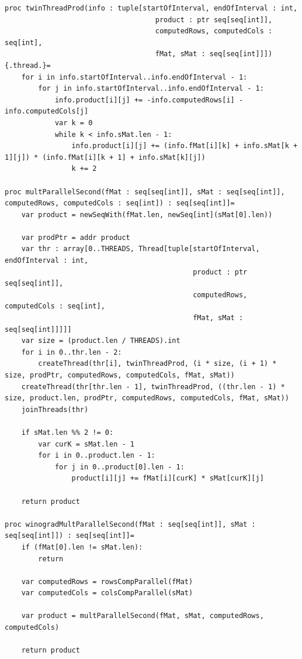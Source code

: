 \documentclass[12pt]{report}
\begin{document}
\begin{lstlisting}[caption=Реализация второй схемы параллельного алгоритма Копперсмита-Винограда,
label={list:paral2}]
proc twinThreadProd(info : tuple[startOfInterval, endOfInterval : int,
                                    product : ptr seq[seq[int]],
                                    computedRows, computedCols : seq[int],
                                    fMat, sMat : seq[seq[int]]]) {.thread.}=
    for i in info.startOfInterval..info.endOfInterval - 1:
        for j in info.startOfInterval..info.endOfInterval - 1:
            info.product[i][j] += -info.computedRows[i] - info.computedCols[j]
            var k = 0
            while k < info.sMat.len - 1:
                info.product[i][j] += (info.fMat[i][k] + info.sMat[k + 1][j]) * (info.fMat[i][k + 1] + info.sMat[k][j])
                k += 2

proc multParallelSecond(fMat : seq[seq[int]], sMat : seq[seq[int]], computedRows, computedCols : seq[int]) : seq[seq[int]]=
    var product = newSeqWith(fMat.len, newSeq[int](sMat[0].len))

    var prodPtr = addr product
    var thr : array[0..THREADS, Thread[tuple[startOfInterval, endOfInterval : int,
                                             product : ptr seq[seq[int]],
                                             computedRows, computedCols : seq[int],
                                             fMat, sMat : seq[seq[int]]]]]
    var size = (product.len / THREADS).int
    for i in 0..thr.len - 2:
        createThread(thr[i], twinThreadProd, (i * size, (i + 1) * size, prodPtr, computedRows, computedCols, fMat, sMat))
    createThread(thr[thr.len - 1], twinThreadProd, ((thr.len - 1) * size, product.len, prodPtr, computedRows, computedCols, fMat, sMat))
    joinThreads(thr)

    if sMat.len %% 2 != 0:
        var curK = sMat.len - 1
        for i in 0..product.len - 1:
            for j in 0..product[0].len - 1:
                product[i][j] += fMat[i][curK] * sMat[curK][j]

    return product

proc winogradMultParallelSecond(fMat : seq[seq[int]], sMat : seq[seq[int]]) : seq[seq[int]]=
    if (fMat[0].len != sMat.len):
        return

    var computedRows = rowsCompParallel(fMat)
    var computedCols = colsCompParallel(sMat)

    var product = multParallelSecond(fMat, sMat, computedRows, computedCols)

    return product
\end{lstlisting}
\end{document}
